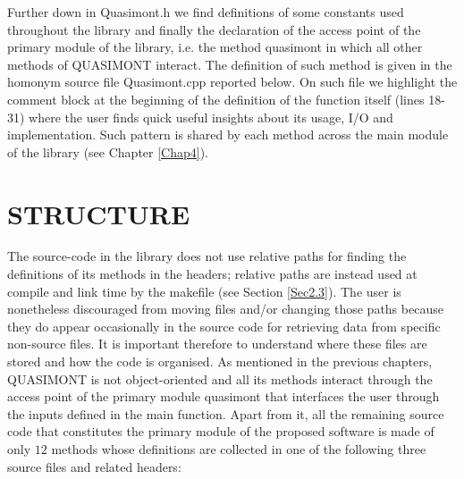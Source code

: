 \documentclass[a4paper, twosided]{book}
\begin{document}
\newpage
\vspace{0.5cm}
\vspace{0.5cm}

\noindent
Further down in \colorbox{poliGrayBlue}{Quasimont.h} we find definitions of some constants used throughout the library and finally the declaration of the access point of the primary module of the library, i.e. the method \colorbox{poliGrayBlue}{quasimont} in which all other methods of QUASIMONT interact. The definition of such method is given in the homonym source file \colorbox{poliGrayBlue}{Quasimont.cpp} reported below. On such file we highlight the comment block at the beginning of the definition of the function itself (lines \colorbox{poliGrayBlue}{18-31}) where the user finds quick useful insights about its usage, I/O and implementation. Such pattern is shared by each method across the main module of the library (see Chapter \ref{Chap4}).

\newpage
{}

\section[Structure]{\changefont STRUCTURE}\label{Sec2.2}

\noindent
The source-code in the library does not use relative paths for finding the definitions of its methods in the headers; relative paths are instead used at compile and link time by the \colorbox{poliGrayBlue}{makefile} (see Section \ref{Sec2.3}). The user is nonetheless discouraged from moving files and/or changing those paths because they do appear occasionally in the source code for retrieving data from specific non-source files. It is important therefore to understand where these files are stored and how the code is organised. As mentioned in the previous chapters, QUASIMONT is not object-oriented and all its methods interact through the access point of the primary module \colorbox{poliGrayBlue}{quasimont} that interfaces the user through the inputs defined in the \colorbox{poliGrayBlue}{main} function. Apart from it, all the remaining source code that constitutes the primary module of the proposed software is made of only $12$ methods whose definitions are collected in one of the following three source files and related headers:
\end{document}
